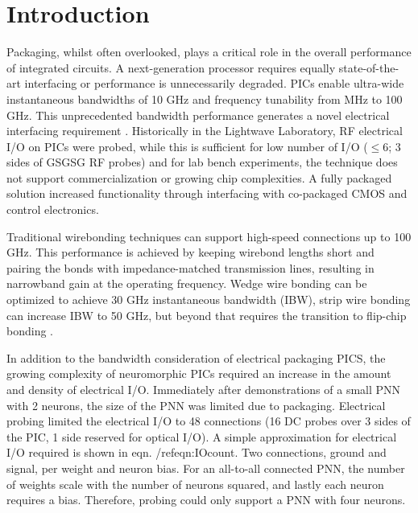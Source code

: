 \section{Introduction}

\qquad Packaging, whilst often overlooked, plays a critical role in the overall performance of integrated circuits. A next-generation processor requires equally state-of-the-art interfacing or performance is unnecessarily degraded. PICs enable ultra-wide instantaneous bandwidths of 10 GHz and frequency tunability from MHz to 100 GHz. This unprecedented bandwidth performance generates a novel electrical interfacing requirement \cite{PIC_Packaging1,PIC_Packaging2_ePIX}. Historically in the Lightwave Laboratory, RF electrical I/O on PICs were probed, while this is sufficient for low number of I/O ($\leq 6$; 3 sides of GSGSG RF probes) and for lab bench experiments, the technique does not support commercialization or growing chip complexities. A fully packaged solution increased functionality through interfacing with co-packaged CMOS and control electronics.

\qquad Traditional wirebonding techniques can support high-speed connections up to 100 GHz. This performance is achieved by keeping wirebond lengths short and pairing the bonds with impedance-matched transmission lines, resulting in narrowband gain at the operating frequency. Wedge wire bonding can be optimized to achieve 30 GHz instantaneous bandwidth (IBW), strip wire bonding can increase IBW to 50 GHz, but beyond that requires the transition to flip-chip bonding \cite{PIC_Packaging3_100GHz,PIC_Packaging4_100GHz2}. 

\qquad In addition to the bandwidth consideration of electrical packaging PICS, the growing complexity of neuromorphic PICs required an increase in the amount and density of electrical I/O. Immediately after demonstrations of a small PNN with 2 neurons, the size of the PNN was limited due to packaging. Electrical probing limited the electrical I/O to 48 connections (16 DC probes over 3 sides of the PIC, 1 side reserved for optical I/O). A simple approximation for electrical I/O required is shown in eqn. /ref{eqn:IOcount}. Two connections, ground and signal, per weight and neuron bias. For an all-to-all connected PNN, the number of weights scale with the number of neurons squared, and lastly each neuron requires a bias. Therefore, probing could only support a PNN with four neurons. 

